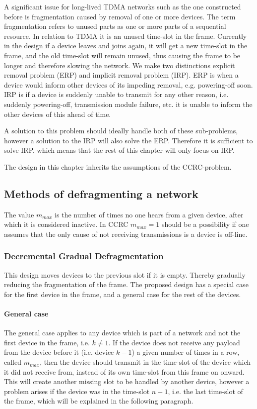 A significant issue for long-lived TDMA networks such as the one constructed before is fragmentation caused by removal of one or more devices. 
The term fragmentation refers to unused parts as one or more parts of a sequential resource. 
In relation to TDMA it is an unused time-slot in the frame. 
Currently in the design if a device leaves and joins again, it will get a new time-slot in the frame, and the old time-slot will remain unused, thus causing the frame to be longer and therefore slowing the network.
We make two distinctions explicit removal problem (ERP) and implicit removal problem (IRP).
ERP is when a device would inform other devices of its impeding removal, e.g. powering-off soon. 
IRP is if a device is suddenly unable to transmit for any other reason, i.e. suddenly powering-off, transmission module failure, etc. it is unable to inform the other devices of this ahead of time. 

A solution to this problem should ideally handle both of these sub-problems, however a solution to the IRP will also solve the ERP.
Therefore it is sufficient to solve IRP, which means that the rest of this chapter will only focus on IRP.  

The design in this chapter inherits the assumptions of the CCRC-problem. 

\subsection{Methods of defragmenting a network}

The value $m_{max}$ is the number of times no one hears from a given device, after which it is considered inactive. 
In CCRC $m_{max} = 1$ should be a possibility if one assumes that the only cause of not receiving transmissions is a device is off-line.  

\subsubsection{Decremental Gradual Defragmentation}
This design moves devices to the previous slot if it is empty. 
Thereby gradually reducing the fragmentation of the frame.
The proposed design has a special case for the first device in the frame, and a general case for the rest of the devices.

\paragraph{General case}
The general case applies to any device which is part of a network and not the first device in the frame, i.e. $k \neq 1$.
If the device does not receive any payload from the device before it (i.e. device $k - 1$) a given number of times in a row, called $m_{max}$, then the device should transmit in the time-slot of the device which it did not receive from, instead of its own time-slot from this frame on onward. 
This will create another missing slot to be handled by another device, however a problem arises if the device was in the time-slot $n - 1$, i.e. the last time-slot of the frame, which will be explained in the following paragraph.

